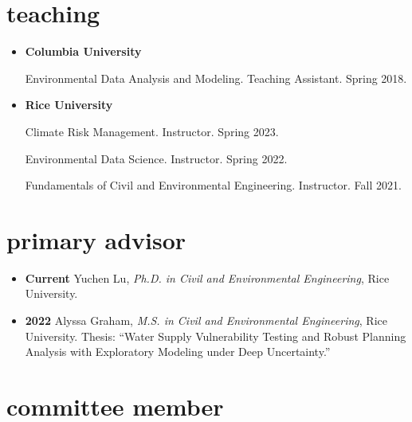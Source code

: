 \documentclass[10pt,oneside]{article}
\begin{document}
\section{teaching}

\mbox{}\vspace{-\dimexpr\baselineskip\relax}


\begin{itemize}[label={}]
  
  \item \textbf{Columbia University}
        
        Environmental Data Analysis and Modeling. Teaching Assistant. Spring 2018.
        
        
  \item \textbf{Rice University}
        
        Climate Risk Management. Instructor. Spring 2023.
        
        Environmental Data Science. Instructor. Spring 2022.
        
        Fundamentals of Civil and Environmental Engineering. Instructor. Fall 2021.
        
        
\end{itemize}


\section{primary advisor}

\mbox{}\vspace{-\dimexpr\baselineskip\relax}

\begin{itemize}[label={}]

  
    \item \textbf{Current} Yuchen Lu, \textit{Ph.D. in Civil and Environmental Engineering}, Rice University. 
  
  
  
    \item \textbf{2022} \quad Alyssa Graham, \textit{M.S. in Civil and Environmental Engineering}, Rice University. Thesis: \enquote{Water Supply Vulnerability Testing and Robust Planning Analysis with Exploratory Modeling under Deep Uncertainty.}
  
\end{itemize}


\section{committee member}
\end{document}
